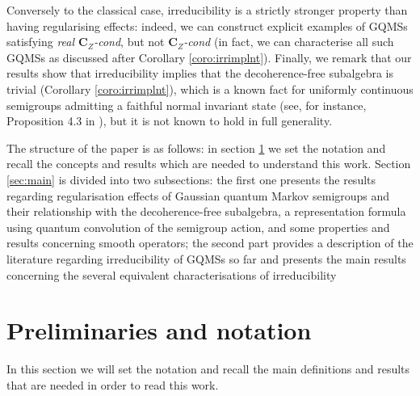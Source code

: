 \documentclass[preprint]{elsarticle}
\theoremstyle{definition}
\begin{document}
Conversely to the classical case, irreducibility is a strictly stronger property than having regularising effects: indeed, we can construct explicit examples of GQMSs satisfying \textit{real $\textbf{C}_{Z}$-cond}, but not \textit{$\textbf{C}_{Z}$-cond} (in fact, we can characterise all such GQMSs as discussed after Corollary \ref{coro:irrimplnt}). Finally, we remark that our results show that irreducibility implies that the decoherence-free subalgebra is trivial (Corollary \ref{coro:irrimplnt}), which is a known fact for uniformly continuous semigroups admitting a faithful normal invariant state (see, for instance, Proposition 4.3 in \cite{DFSU16}), but it is not known to hold in full generality.

The structure of the paper is as follows: in section \ref{sec:pre} we set the notation and recall the concepts and results which are needed to understand this work. Section \ref{sec:main} is divided into two subsections: the first one presents the results regarding regularisation effects of Gaussian quantum Markov semigroups and their relationship with the decoherence-free subalgebra, a representation formula using quantum convolution of the semigroup action, and some properties and results concerning smooth operators; the second part provides a description of the literature regarding irreducibility of GQMSs so far and presents the main results concerning the several equivalent characterisations of irreducibility





\section{Preliminaries and notation} \label{sec:pre}
In this section we will set the notation and recall the main definitions and results that are needed in order to read this work.
\end{document}
